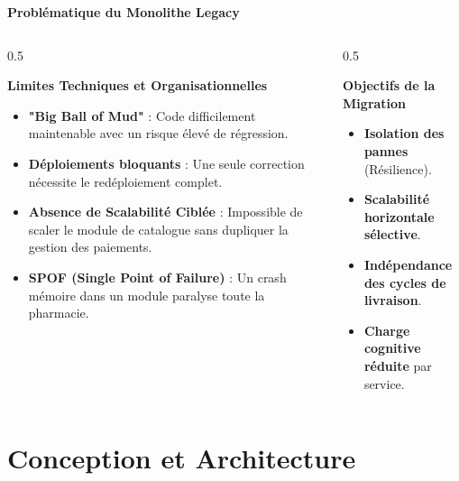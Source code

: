 \documentclass[10pt,aspectratio=169]{beamer}
\begin{document}
\begin{frame}{\textbf{Problématique du Monolithe Legacy}}
    \begin{columns}
        \begin{column}{0.5\textwidth}
            \begin{alertblock}{\textbf{Limites Techniques et Organisationnelles}}
                \begin{itemize}
                    \item \textbf{"Big Ball of Mud"} : Code difficilement maintenable avec un risque élevé de régression.
                    \item \textbf{Déploiements bloquants} : Une seule correction nécessite le redéploiement complet.
                    \item \textbf{Absence de Scalabilité Ciblée} : Impossible de scaler le module de catalogue sans dupliquer la gestion des paiements.
                    \item \textbf{SPOF (Single Point of Failure)} : Un crash mémoire dans un module paralyse toute la pharmacie.
                \end{itemize}
            \end{alertblock}
        \end{column}
        \begin{column}{0.5\textwidth}
            \begin{block}{\textbf{Objectifs de la Migration}}
                \begin{itemize}
                    \item \textbf{Isolation des pannes} (Résilience).
                    \item \textbf{Scalabilité horizontale sélective}.
                    \item \textbf{Indépendance des cycles de livraison}.
                    \item \textbf{Charge cognitive réduite} par service.
                \end{itemize}
            \end{block}
        \end{column}
    \end{columns}
\end{frame}

\section{Conception et Architecture}
\end{document}
